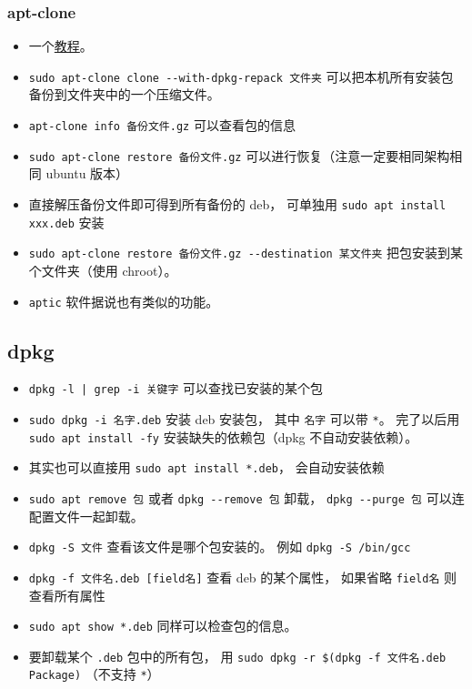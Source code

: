 \subsubsection{apt-clone}
\begin{itemize}
\item 一个\href{https://ubunlog.com/en/apt-clone-copia-seguridad-paquetes/}{教程}。
\item \verb|sudo apt-clone clone --with-dpkg-repack 文件夹| 可以把本机所有安装包备份到文件夹中的一个压缩文件。
\item \verb|apt-clone info 备份文件.gz| 可以查看包的信息
\item \verb|sudo apt-clone restore 备份文件.gz| 可以进行恢复（注意一定要相同架构相同 ubuntu 版本）
\item 直接解压备份文件即可得到所有备份的 deb， 可单独用 \verb|sudo apt install xxx.deb| 安装
\item \verb|sudo apt-clone restore 备份文件.gz --destination 某文件夹| 把包安装到某个文件夹（使用 chroot）。
\item \verb|aptic| 软件据说也有类似的功能。
\end{itemize}



\subsection{dpkg}
\begin{itemize}
\item \verb`dpkg -l | grep -i 关键字` 可以查找已安装的某个包
\item \verb|sudo dpkg -i 名字.deb| 安装 deb 安装包， 其中 \verb|名字| 可以带 \verb|*|。 完了以后用 \verb|sudo apt install -fy| 安装缺失的依赖包（dpkg 不自动安装依赖）。
\item 其实也可以直接用 \verb|sudo apt install *.deb|， 会自动安装依赖
\item \verb|sudo apt remove 包| 或者 \verb|dpkg --remove 包| 卸载， \verb|dpkg --purge 包| 可以连配置文件一起卸载。
\item \verb|dpkg -S 文件| 查看该文件是哪个包安装的。 例如 \verb|dpkg -S /bin/gcc|
\item \verb|dpkg -f 文件名.deb [field名]| 查看 deb 的某个属性， 如果省略 \verb|field名| 则查看所有属性
\item \verb|sudo apt show *.deb| 同样可以检查包的信息。
\item 要卸载某个 \verb|.deb| 包中的所有包， 用 \verb|sudo dpkg -r $(dpkg -f 文件名.deb Package)| （不支持 \verb|*|）
\end{itemize}

